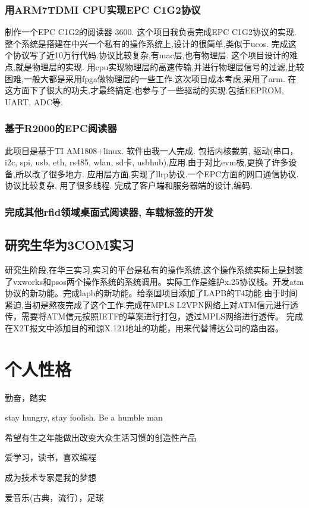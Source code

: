 \documentclass[titlepage]{article}
\begin{document}
\subsubsection{用ARM7TDMI CPU实现EPC C1G2协议}
制作一个EPC C1G2的阅读器 3600. 这个项目我负责完成EPC C1G2协议的实现.整个系统是搭建在中兴一个私有的操作系统上,设计的很简单,类似于ucos. 完成这个协议写了近10万行代码.协议比较复杂,有mac层,也有物理层. 这个项目设计的难点,就是物理层的实现. 用cpu实现物理层的高速传输,并进行物理层信号的过滤,比较困难,一般大都是采用fpga做物理层的一些工作.这次项目成本考虑,采用了arm. 在这方面下了很大的功夫,才最终搞定.也参与了一些驱动的实现.包括EEPROM, UART, ADC等.


\subsubsection{基于R2000的EPC阅读器}
此项目是基于TI AM1808+linux. 软件由我一人完成. 包括内核裁剪, 驱动(串口，i2c, spi, usb, eth, rs485, wlan, sd卡, usbhub),应用.由于对比evm板,更换了许多设备,所以改了很多地方. 应用层方面,实现了llrp协议.一个EPC方面的网口通信协议. 协议比较复杂. 用了很多线程. 完成了客户端和服务器端的设计,编码.


\subsubsection{完成其他rfid领域桌面式阅读器, 车载标签的开发}



\subsection{研究生华为3COM实习}

研究生阶段,在华三实习,实习的平台是私有的操作系统,这个操作系统实际上是封装了vxworks和psos两个操作系统的系统调用。实际工作是维护x.25协议栈。开发atm协议的新功能。完成lapb的新功能。给泰国项目添加了LAPB的T4功能.由于时间紧迫,当初是熬夜完成了这个工作.完成在MPLS L2VPN网络上对ATM信元进行透传，需要将ATM信元按照IETF的草案进行打包，透过MPLS网络进行透传。 完成在X2T报文中添加目的和源X.121地址的功能，用来代替博达公司的路由器。 

\section{个人性格}

\begin{compactitem}
    \item 勤奋，踏实
    \item {\color{red}stay hungry, stay foolish. Be a humble man}
    \item 希望有生之年能做出{\color{red}改变大众生活习惯的创造性产品}
    \item 爱学习，读书，喜欢编程
    \item 成为技术专家是我的梦想
    \item 爱音乐(古典，流行），足球
\end{compactitem}
\end{document}
